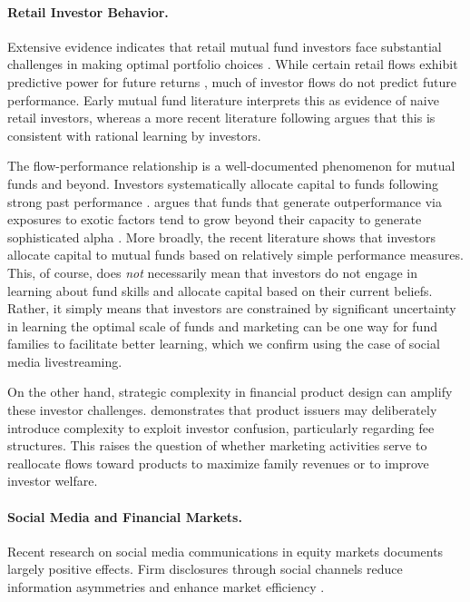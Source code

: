 \documentclass[12pt]{article}
\begin{document}
\paragraph{Retail Investor Behavior.} Extensive evidence indicates that retail mutual fund investors face substantial challenges in making optimal portfolio choices \citep{bailey2011behavioral, barber2016attention, choi2020attention, bendavid2022attention}. While certain retail flows exhibit predictive power for future returns \citep{lou2012flow}, much of investor flows do not predict future performance. Early mutual fund literature interprets this as evidence of naive retail investors, whereas a more recent literature following \citet{berk2004mutual} argues that this is consistent with rational learning by investors.

The flow-performance relationship is a well-documented phenomenon for mutual funds and beyond. Investors systematically allocate capital to funds following strong past performance \citep{sirri1998costly}.\@ \citep{song2020mismatch} argues that funds that generate outperformance via exposures to exotic factors tend to grow beyond their capacity to generate sophisticated alpha \citep{song2020mismatch}. More broadly, the recent literature \citep{berk2016assessing,barber2016which,ben-david2022what} shows that investors allocate capital to mutual funds based on relatively simple performance measures. This, of course, does \textit{not} necessarily mean that investors do not engage in learning about fund skills and allocate capital based on their current beliefs. Rather, it simply means that investors are constrained by significant uncertainty in learning the optimal scale of funds and marketing can be one way for fund families to facilitate better learning, which we confirm using the case of social media livestreaming.

On the other hand, strategic complexity in financial product design can amplify these investor challenges.\@ \citet{carlin2009strategic} demonstrates that product issuers may deliberately introduce complexity to exploit investor confusion, particularly regarding fee structures. This raises the question of whether marketing activities serve to reallocate flows toward products to maximize family revenues or to improve investor welfare. 

\paragraph{Social Media and Financial Markets.} Recent research on social media communications in equity markets documents largely positive effects. Firm disclosures through social channels reduce information asymmetries and enhance market efficiency \citep{blankespoor2014role, jung2018firms, lee2022talk, nekrasov2022visuals, choi2024investor, crowley2024discretionary, wong2024calling}.
\end{document}
